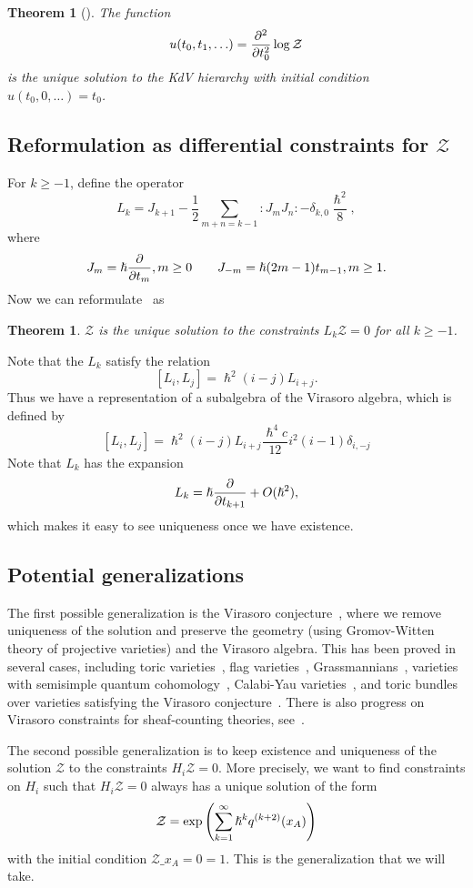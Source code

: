 \documentclass{amsart}
\newtheorem{thm}{Theorem}[section]
\theoremstyle{definition}
\theoremstyle{remark}
\theoremstyle{plain}
\newtheorem*{thm*}{Theorem}
\theoremstyle{definition}
\theoremstyle{remark}
\newcommand{\mc}[1]{\mathcal{#1}}
\newcommand{\1}{\mathbf{1}}
\newcommand{\2}{\mathbf{2}}
\newcommand{\3}{\mathbf{3}}
\begin{document}
\begin{thm}[\cite{wittenconj}]\label{thm:witten}
    The function
    \[ u(t_0, t_1, \ldots) = \pdv[2]{t_0} \log \mc{Z} \]
    is the unique solution to the KdV hierarchy with initial condition $u(t_0, 0, \ldots) = t_0$.
\end{thm}

\subsection{Reformulation as differential constraints for $\mc{Z}$}

For $k \geq -1$, define the operator
\[ L_k = J_{k+1} - \frac{1}{2} \sum_{m+n=k-1} :J_m J_n: - \delta_{k,0} \frac{\hslash^2}{8}, \]
where
\[ J_m = \hslash \pdv{t_m}, m \geq 0 \qquad J_{-m} = \hslash(2m-1)t_{m-1}, m \geq 1. \]
Now we can reformulate~ as
\begin{thm*}
    $\mc{Z}$ is the unique solution to the constraints $L_k \mc{Z} = 0$ for all $k \geq -1$.
\end{thm*}

Note that the $L_k$ satisfy the relation
\[ [L_i, L_j] = \hslash^2(i-j)L_{i+j}. \]
Thus we have a representation of a subalgebra of the Virasoro algebra, which is defined by
\[ [L_i, L_j] = \hslash^2(i-j)L_{i+j} \frac{\hslash^4 c}{12} i^2(i-1) \delta_{i, -j} \]
Note that $L_k$ has the expansion
\[ L_k = \hslash \pdv{t_{k+1}} + O(\hslash^2), \]
which makes it easy to see uniqueness once we have existence.

\subsection{Potential generalizations}

The first possible generalization is the Virasoro conjecture~\cite{virasoroconj}, where we remove uniqueness of the solution and preserve the geometry (using Gromov-Witten theory of projective varieties) and the Virasoro algebra. This has been proved in several cases, including toric varieties~\cites{virasorofanotoric}{virasorotoric}, flag varieties~\cite{virasoroflag}, Grassmannians~\cite{virasorograss}, varieties with semisimple quantum cohomology~\cite{2dsscohft}, Calabi-Yau varieties~\cite{virasorogw}, and toric bundles over varieties satisfying the Virasoro conjecture~\cite{virasorotoricbundle}. There is also progress on Virasoro constraints for sheaf-counting theories, see~\cite{virasoropt}.

The second possible generalization is to keep existence and uniqueness of the solution $\mc{Z}$ to the constraints $H_i \mc{Z} = 0$. More precisely, we want to find constraints on $H_i$ such that $H_i \mc{Z} = 0$ always has a unique solution of the form
\[ \mc{Z} = \exp \qty(\sum_{k=1}^{\infty} \hslash^k q^{(k+2)}(x_A)) \]
with the initial condition $\mc{Z} \_{x_A = 0} = 1$. This is the generalization that we will take.
\end{document}
